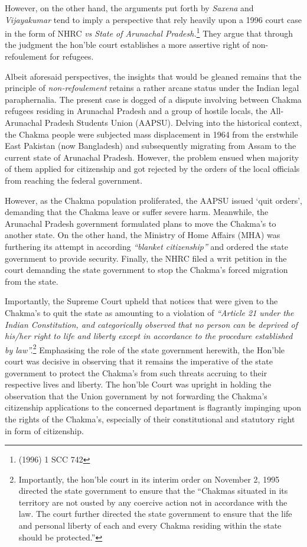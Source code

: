 \begin{multicols}{2}
\vspace{-.15cm}

\noi
However, on the other hand, the arguments put forth by \textit{Saxena} and \textit{Vijayakumar} tend to
imply a perspective that rely heavily upon a 1996 court case in the form of NHRC \textit{vs State of
Arunachal Pradesh.}\footnote{(1996) 1 SCC 742} They argue that through the judgment the hon’ble court establishes a
more assertive right of non-refoulement for refugees.

\noi
Albeit aforesaid perspectives, the insights that would be gleaned remains that the principle of
\textit{non-refoulement} retains a rather arcane status under the Indian legal paraphernalia. The
present case is dogged of a dispute involving between Chakma refugees residing in
Arunachal Pradesh and a group of hostile locals, the All-Arunachal Pradesh Students Union
(AAPSU). Delving into the historical context, the Chakma people were subjected mass
displacement in 1964 from the erstwhile East Pakistan (now Bangladesh) and subsequently
migrating from Assam to the current state of Arunachal Pradesh. However, the problem
ensued when majority of them applied for citizenship and got rejected by the orders of the
local officials from reaching the federal government.

\noi
However, as the Chakma population proliferated, the AAPSU issued `quit orders', demanding
that the Chakma leave or suffer severe harm. Meanwhile, the Arunachal Pradesh government
formulated plans to move the Chakma’s to another state. On the other hand, the Ministry of
Home Affairs (MHA) was furthering its attempt in according \textit{“blanket citizenship”} and
ordered the state government to provide security. Finally, the NHRC filed a writ petition in
the court demanding the state government to stop the Chakma’s forced migration from the
state.

\noi
Importantly, the Supreme Court upheld that notices that were given to the Chakma’s to quit
the state as amounting to a violation of \textit{“Article 21 under the Indian Constitution, and
categorically observed that no person can be deprived of his/her right to life and liberty
except in accordance to the procedure established by law”.}\footnote{Importantly, the hon’ble court in its interim order on November 2, 1995 directed the state government to ensure that the “Chakmas situated in its territory are not ousted by any coercive action not in accordance with the law. The court further directed the state government to ensure that the life and personal liberty of each and every Chakma residing within the state should be protected.”} Emphasising the role of the state government herewith, the Hon’ble court was decisive in observing that it remains the
imperative of the state government to protect the Chakma’s from such threats accruing to
their respective lives and liberty. The hon’ble Court was upright in holding the observation
that the Union government by not forwarding the Chakma’s citizenship applications to the
concerned department is flagrantly impinging upon the rights of the Chakma’s, especially of
their constitutional and statutory right in form of citizenship.


\end{multicols}
